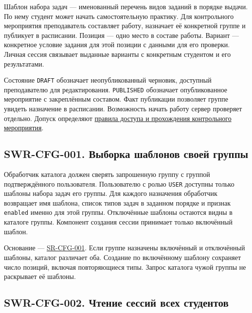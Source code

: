 \documentclass[12pt,a4paper]{article}
\begin{document}
\hypertarget{конфигурации-контрольные-мероприятия-и-модерация}{}

Шаблон набора задач --- именованный перечень видов заданий в порядке выдачи. По нему студент может начать самостоятельную практику. Для контрольного мероприятия преподаватель составляет работу, назначает её конкретной группе и публикует в расписании. Позиция --- одно место в составе работы. Вариант --- конкретное условие задания для этой позиции с данными для его проверки. Личная сессия связывает выданные варианты с конкретным студентом и его результатами.

Состояние \texttt{DRAFT} обозначает неопубликованный черновик, доступный преподавателю для редактирования. \texttt{PUBLISHED} обозначает опубликованное мероприятие с закреплённым составом. Факт публикации позволяет группе увидеть назначение в расписании. Возможность начать работу сервер проверяет отдельно. Допуск определяют {\href{../02\_Техническое\_задание/DOC-02\_Техническое\_задание.pdf\#правила-доступа-и-прохождения-контрольного-мероприятия}{правила доступа и прохождения контрольного мероприятия}}.

\subsection{SWR-CFG-001. Выборка шаблонов своей группы}\label{swr-cfg-001-ux432ux44bux431ux43eux440ux43aux430-ux448ux430ux431ux43bux43eux43dux43eux432-ux441ux432ux43eux435ux439-ux433ux440ux443ux43fux43fux44b}

\hypertarget{swr-cfg-001-выборка-шаблонов-своей-группы}{}

\hypertarget{swr-cfg-001}{}

Обработчик каталога должен сверять запрошенную группу с группой подтверждённого пользователя. Пользователю с ролью \texttt{USER} доступны только шаблоны набора задач его группы. Для каждого назначения обработчик возвращает имя шаблона, список типов задач в заданном порядке и признак \texttt{enabled} именно для этой группы. Отключённые шаблоны остаются видны в каталоге группы. Компонент создания сессии принимает только включённый шаблон.

Основание --- {\href{../04\_Системные\_требования/DOC-05\_Системные\_требования.pdf\#sr-cfg-001}{SR-CFG-001}}. Если группе назначены включённый и отключённый шаблоны, каталог различает оба. Создание по включённому шаблону сохраняет число позиций, включая повторяющиеся типы. Запрос каталога чужой группы не раскрывает её шаблоны.

\subsection{SWR-CFG-002. Чтение сессий всех студентов}\label{swr-cfg-002-ux447ux442ux435ux43dux438ux435-ux441ux435ux441ux441ux438ux439-ux432ux441ux435ux445-ux441ux442ux443ux434ux435ux43dux442ux43eux432}
\end{document}

